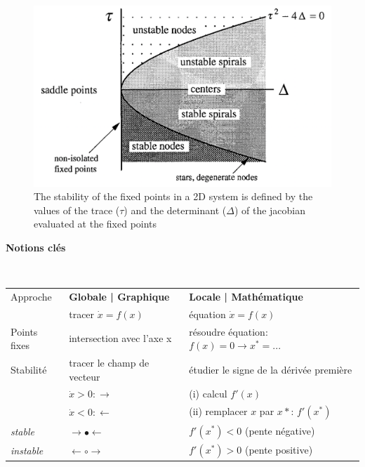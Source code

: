 \begin{figure}[h!]
    \centering
    \includegraphics[scale=0.3]{latex/fig/Methods/Strogatz.png}
    \caption{The stability of the fixed points in a 2D system is defined by the values of the trace ($\tau$) and the determinant ($\Delta$) of the jacobian evaluated at the fixed points \citep{strogatz_nonlinear_2015}}
    \label{fig:strogatz}
\end{figure}


\begin{pinkshaded}
\begin{center}
\textbf{Notions clés}\\
\end{center}
~\\
\begin{tabular}{l| l l}
    Approche &\textbf{Globale | Graphique}  & \textbf{Locale | Mathématique} \\
     &tracer $\dot{x} = f(x)$ & équation $\dot{x} = f(x)$ \\
    Points fixes & intersection avec l'axe x & résoudre équation:$f(x)=0 \rightarrow x^*=...$\\
    Stabilité & tracer le champ de vecteur & étudier le signe de la dérivée première \\
    & $\dot{x}>0: \rightarrow$& (i) calcul $f'(x)$\\
    & $\dot{x}<0: \leftarrow$& (ii) remplacer $x$ par $x*$: $f'(x^*)$\\
    \textit{stable} &     $\rightarrow \bullet \leftarrow$ &  $f'(x^*)<0$ (pente négative)\\
    \textit{instable}&    $\leftarrow \circ \rightarrow$ &  $f'(x^*)>0$ (pente positive)\\
\end{tabular}
\end{pinkshaded}



